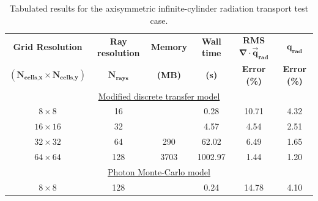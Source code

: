 \begin{table}[ht]
 \centering
 \small
 \caption{Tabulated results for the axisymmetric infinite-cylinder radiation transport test case.}
 \label{tab:axi_results}
  \begin{threeparttable}
 \begin{tabular*}{0.95\textwidth}%
     {@{\extracolsep{\fill}}cccccc}
  \hline \hline \textbf{Grid Resolution}                                & \textbf{Ray resolution}      & \textbf{Memory}  &  \textbf{Wall time} & \textbf{RMS $\mathbf{\nabla \cdot \vec{q}_\text{rad}}$} & \textbf{$\mathbf{q_\text{rad}}$} \\
$\mathbf{(N_{\text{cells,x}}\times N_{\text{cells,y}})}$    & $\mathbf{N_\text{rays}}$  & \textbf{(MB)}        & \textbf{(s)}              & \textbf{Error (\%)}                                                      & \textbf{Error (\%)}                \\
\hline \multicolumn{6}{c}{\underline{Modified discrete transfer model}} \\
              $8 \times 8$                                                              & 16                                        &                                &   0.28                     &  10.71                                                                         & 4.32 \\
              $16 \times 16$                                                         &  32                                        &                                &  4.57                      & 4.54                                                                            & 2.51 \\
              $32 \times 32$                                                         & 64                                         &    290                     &  62.02                    & 6.49                                                                            & 1.65 \\
              $64 \times 64$                                                         & 128                                       &    3703                  &  1002.97                & 1.44                                                                            & 1.20 \\
\hline \multicolumn{6}{c}{\underline{Photon Monte-Carlo model}} \\
              $8 \times 8$                                                              & 128                                       &                                &  0.24                       &  14.78                                                                       & 4.10 \\

\end{tabular*}
\end{threeparttable}
\end{table}
